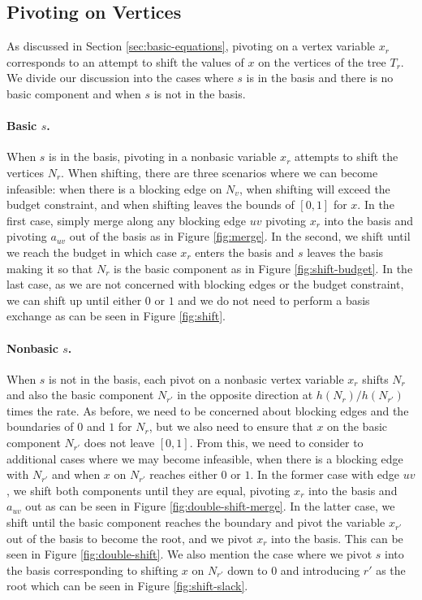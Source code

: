 \documentclass[titlepage,11pt]{article}
\begin{document}
\subsection{Pivoting on Vertices}
As discussed in Section \ref{sec:basic-equations}, pivoting on a vertex variable $x_r$ corresponds to an attempt to shift the values of $x$ on the vertices of the tree $T_r$. We divide our discussion into the cases where $s$ is in the basis and there is no basic component and when $s$ is not in the basis.

\paragraph{Basic $s$.}
When $s$ is in the basis, pivoting in a nonbasic variable $x_r$ attempts to shift the vertices $N_r$. When shifting, there are three scenarios where we can become infeasible: when there is a blocking edge on $N_v$, when shifting will exceed the budget constraint, and when shifting leaves the bounds of $[0,1]$ for $x$. In the first case, simply merge along any blocking edge $uv$ pivoting $x_r$ into the basis and pivoting $a_{uv}$ out of the basis as in Figure \ref{fig:merge}. In the second, we shift until we reach the budget in which case $x_r$ enters the basis and $s$ leaves the basis making it so that $N_r$ is the basic component as in Figure \ref{fig:shift-budget}. In the last case, as we are not concerned with blocking edges or the budget constraint, we can shift up until either $0$ or $1$ and we do not need to perform a basis exchange as can be seen in Figure \ref{fig:shift}.

\paragraph{Nonbasic $s$.}
When $s$ is not in the basis, each pivot on a nonbasic vertex variable $x_r$ shifts $N_r$ and also the basic component $N_{r'}$ in the opposite direction at $h(N_r)/h(N_{r'})$ times the rate. As before, we need to be concerned about blocking edges and the boundaries of $0$ and $1$ for $N_r$, but we also need to ensure that $x$ on the basic component $N_{r'}$ does not leave $[0,1]$. From this, we need to consider to additional cases where we may become infeasible, when there is a blocking edge with $N_{r'}$ and when $x$ on $N_{r'}$ reaches either $0$ or $1$. In the former case with edge $uv$, we shift both components until they are equal, pivoting $x_r$ into the basis and $a_{uv}$ out as can be seen in Figure \ref{fig:double-shift-merge}. In the latter case, we shift until the basic component reaches the boundary and pivot the variable $x_{r'}$ out of the basis to become the root, and we pivot $x_r$ into the basis. This can be seen in Figure \ref{fig:double-shift}. We also mention the case where we pivot $s$ into the basis corresponding to shifting $x$ on $N_{r'}$ down to 0 and introducing $r'$ as the root which can be seen in Figure \ref{fig:shift-slack}.
\end{document}

